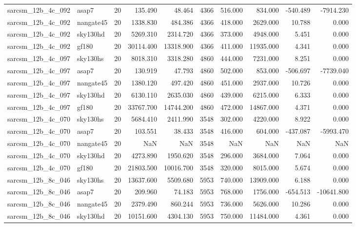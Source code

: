 \documentclass{article}
\begin{document}
\begin{longtable}{llrrrrrrrr}
sarcsm\_12b\_4c\_092 & asap7 & 20 & 135.490 & 48.464 & 4366 & 516.000 & 834.000 & -540.489 & -7914.230 \\
sarcsm\_12b\_4c\_092 & nangate45 & 20 & 1338.830 & 484.386 & 4366 & 418.000 & 2629.000 & 10.788 & 0.000 \\
sarcsm\_12b\_4c\_092 & sky130hd & 20 & 5269.310 & 2314.720 & 4366 & 373.000 & 4948.000 & 5.451 & 0.000 \\
sarcsm\_12b\_4c\_092 & gf180 & 20 & 30114.400 & 13318.900 & 4366 & 411.000 & 11935.000 & 4.341 & 0.000 \\
sarcsm\_12b\_4c\_097 & sky130hs & 20 & 8018.310 & 3318.280 & 4860 & 444.000 & 7231.000 & 8.251 & 0.000 \\
sarcsm\_12b\_4c\_097 & asap7 & 20 & 130.919 & 47.793 & 4860 & 502.000 & 853.000 & -506.697 & -7739.040 \\
sarcsm\_12b\_4c\_097 & nangate45 & 20 & 1380.120 & 497.420 & 4860 & 451.000 & 2937.000 & 10.726 & 0.000 \\
sarcsm\_12b\_4c\_097 & sky130hd & 20 & 6130.110 & 2635.030 & 4860 & 439.000 & 6215.000 & 6.333 & 0.000 \\
sarcsm\_12b\_4c\_097 & gf180 & 20 & 33767.700 & 14744.200 & 4860 & 472.000 & 14867.000 & 4.371 & 0.000 \\
sarcsm\_12b\_4c\_070 & sky130hs & 20 & 5684.410 & 2411.990 & 3548 & 302.000 & 4220.000 & 8.922 & 0.000 \\
sarcsm\_12b\_4c\_070 & asap7 & 20 & 103.551 & 38.433 & 3548 & 416.000 & 604.000 & -437.087 & -5993.470 \\
sarcsm\_12b\_4c\_070 & nangate45 & 20 & NaN & NaN & 3548 & NaN & NaN & NaN & NaN \\
sarcsm\_12b\_4c\_070 & sky130hd & 20 & 4273.890 & 1950.620 & 3548 & 296.000 & 3684.000 & 7.064 & 0.000 \\
sarcsm\_12b\_4c\_070 & gf180 & 20 & 21803.500 & 10016.700 & 3548 & 320.000 & 8015.000 & 5.674 & 0.000 \\
sarcsm\_12b\_8c\_046 & sky130hs & 20 & 13637.600 & 5509.680 & 5953 & 740.000 & 13909.000 & 6.188 & 0.000 \\
sarcsm\_12b\_8c\_046 & asap7 & 20 & 209.960 & 74.183 & 5953 & 768.000 & 1756.000 & -654.513 & -10641.800 \\
sarcsm\_12b\_8c\_046 & nangate45 & 20 & 2379.490 & 860.244 & 5953 & 736.000 & 5626.000 & 10.286 & 0.000 \\
sarcsm\_12b\_8c\_046 & sky130hd & 20 & 10151.600 & 4304.130 & 5953 & 750.000 & 11484.000 & 4.361 & 0.000 \\

\end{longtable}
\end{document}
